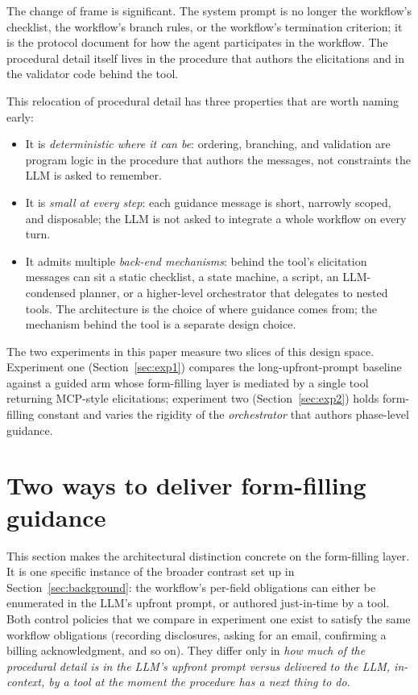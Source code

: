\documentclass[11pt,a4paper]{article}
\begin{document}
The change of frame is significant. The system prompt is no longer the workflow's checklist, the workflow's branch rules, or the workflow's termination criterion; it is the protocol document for how the agent participates in the workflow. The procedural detail itself lives in the procedure that authors the elicitations and in the validator code behind the tool.

This relocation of procedural detail has three properties that are worth naming early:

\begin{itemize}[noitemsep]
    \item It is \emph{deterministic where it can be}: ordering, branching, and validation are program logic in the procedure that authors the messages, not constraints the LLM is asked to remember.
    \item It is \emph{small at every step}: each guidance message is short, narrowly scoped, and disposable; the LLM is not asked to integrate a whole workflow on every turn.
    \item It admits multiple \emph{back-end mechanisms}: behind the tool's elicitation messages can sit a static checklist, a state machine, a script, an LLM-condensed planner, or a higher-level orchestrator that delegates to nested tools. The architecture is the choice of where guidance comes from; the mechanism behind the tool is a separate design choice.
\end{itemize}

The two experiments in this paper measure two slices of this design space. Experiment one (Section~\ref{sec:exp1}) compares the long-upfront-prompt baseline against a guided arm whose form-filling layer is mediated by a single tool returning MCP-style elicitations; experiment two (Section~\ref{sec:exp2}) holds form-filling constant and varies the rigidity of the \emph{orchestrator} that authors phase-level guidance.

\section{Two ways to deliver form-filling guidance}
\label{sec:capture}

This section makes the architectural distinction concrete on the form-filling layer. It is one specific instance of the broader contrast set up in Section~\ref{sec:background}: the workflow's per-field obligations can either be enumerated in the LLM's upfront prompt, or authored just-in-time by a tool. Both control policies that we compare in experiment one exist to satisfy the same workflow obligations (recording disclosures, asking for an email, confirming a billing acknowledgment, and so on). They differ only in \emph{how much of the procedural detail is in the LLM's upfront prompt versus delivered to the LLM, in-context, by a tool at the moment the procedure has a next thing to do}.
\end{document}
